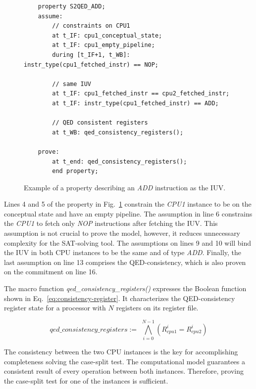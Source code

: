 \begin{figure}[htb!]
    \begin{lstlisting}
    property S2QED_ADD;
    assume:
        // constraints on CPU1
        at t_IF: cpu1_conceptual_state;
        at t_IF: cpu1_empty_pipeline;
        during [t_IF+1, t_WB]: instr_type(cpu1_fetched_instr) == NOP;
    
        // same IUV
        at t_IF: cpu1_fetched_instr == cpu2_fetched_instr;
        at t_IF: instr_type(cpu1_fetched_instr) == ADD;
    
        // QED consistent registers
        at t_WB: qed_consistency_registers();
    
    prove:
        at t_end: qed_consistency_registers();
        end property;\end{lstlisting}
    \caption{Example of a \SSQED{} property describing an \textit{ADD} instruction as the IUV.}
    \label{fig:ex-s2qed-add-ppt}
\end{figure}

Lines 4 and 5 of the property in Fig.~\ref{fig:ex-s2qed-add-ppt} constrain the \textit{CPU1} instance to be on the conceptual state and have an empty pipeline. The assumption in line 6 constrains the \textit{CPU1} to fetch only \textit{NOP} instructions after fetching the IUV. This assumption is not crucial to prove the model, however, it reduces unnecessary complexity for the SAT-solving tool. The assumptions on lines 9 and 10 will bind the IUV in both CPU instances to be the same and of type \textit{ADD}. Finally, the last assumption on line 13 comprises the QED-consistency, which is also proven on the commitment on line 16.

The macro function \textit{qed\_consistency\_registers()} expresses the Boolean function shown in Eq.~\ref{eq:consistency-register}. It characterizes the QED-consistency register state for a processor with $N$ registers on its register file.

\begin{equation}
    qed\_consistency\_registers := \,\, \bigwedge_{i = 0}^{N-1} \left(R^i_{cpu1} = R^i_{cpu2}\right)
    \label{eq:consistency-register}
\end{equation}

The consistency between the two CPU instances is the key for accomplishing completeness solving the case-split test. The \SSQED{} computational model guarantees a consistent result of every operation between both instances. Therefore, proving the case-split test for one of the instances is sufficient.

